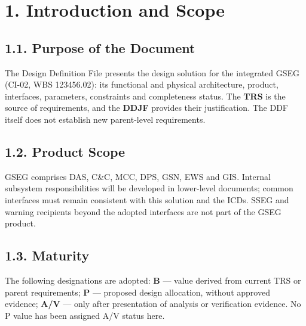 \section{1. Introduction and Scope}\label{introduction-and-scope}

\subsection{1.1. Purpose of the Document}\label{purpose-of-the-document}

The Design Definition File presents the design solution for the integrated GSEG (CI-02, WBS 123456.02): its functional and physical architecture, product, interfaces, parameters, constraints and completeness status. The \textbf{TRS} is the source of requirements, and the \textbf{DDJF} provides their justification. The DDF itself does not establish new parent-level requirements.

\subsection{1.2. Product Scope}\label{product-scope}

GSEG comprises DAS, C\&C, MCC, DPS, GSN, EWS and GIS. Internal subsystem responsibilities will be developed in lower-level documents; common interfaces must remain consistent with this solution and the ICDs. SSEG and warning recipients beyond the adopted interfaces are not part of the GSEG product.

\subsection{1.3. Maturity}\label{design-maturity}

The following designations are adopted: \textbf{B} — value derived from current TRS or parent requirements; \textbf{P} — proposed design allocation, without approved evidence; \textbf{A/\allowbreak{}V} — only after presentation of analysis or verification evidence. No P value has been assigned A/\allowbreak{}V status here.
